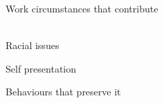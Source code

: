 \documentclass[aspectratio=169]{beamer}
\begin{document}
\begin{frame}
  \begin{center}
    \Huge Work circumstances that contribute
    \\ \small \cite{hh15}
    \\ \small \cite{clark14}
  \end{center}
\end{frame}

\begin{frame}
  \begin{center}
    \Huge Racial issues
    \\ \small \cite{colour}
  \end{center}
\end{frame}

\begin{frame}
  \begin{center}
    \Huge Self presentation
    \\ \small \cite{sakulku11}
  \end{center}
\end{frame}

\begin{frame}
  \begin{center}
    \Huge Behaviours that preserve it
  \end{center}
\end{frame}
\end{document}
